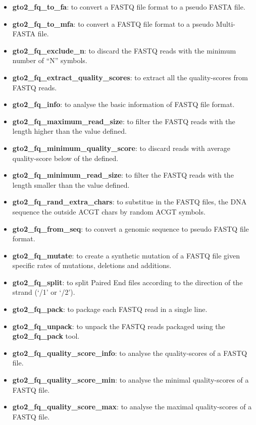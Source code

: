 \documentclass[11pt,]{krantz}
\providecommand{\tightlist}{%
  \setlength{\itemsep}{0pt}\setlength{\parskip}{0pt}}
\begin{document}
\begin{itemize}
\tightlist
\item
  \textbf{gto2\_fq\_to\_fa}: to convert a FASTQ file format to a pseudo
  FASTA file.
\item
  \textbf{gto2\_fq\_to\_mfa}: to convert a FASTQ file format to a pseudo
  Multi-FASTA file.
\item
  \textbf{gto2\_fq\_exclude\_n}: to discard the FASTQ reads with the
  minimum number of ``N'' symbols.
\item
  \textbf{gto2\_fq\_extract\_quality\_scores}: to extract all the
  quality-scores from FASTQ reads.
\item
  \textbf{gto2\_fq\_info}: to analyse the basic information of FASTQ
  file format.
\item
  \textbf{gto2\_fq\_maximum\_read\_size}: to filter the FASTQ reads with
  the length higher than the value defined.
\item
  \textbf{gto2\_fq\_minimum\_quality\_score}: to discard reads with
  average quality-score below of the defined.
\item
  \textbf{gto2\_fq\_minimum\_read\_size}: to filter the FASTQ reads with
  the length smaller than the value defined.
\item
  \textbf{gto2\_fq\_rand\_extra\_chars}: to substitue in the FASTQ
  files, the DNA sequence the outside ACGT chars by random ACGT symbols.
\item
  \textbf{gto2\_fq\_from\_seq}: to convert a genomic sequence to pseudo
  FASTQ file format.
\item
  \textbf{gto2\_fq\_mutate}: to create a synthetic mutation of a FASTQ
  file given specific rates of mutations, deletions and additions.
\item
  \textbf{gto2\_fq\_split}: to split Paired End files according to the
  direction of the strand (`/1' or `/2').
\item
  \textbf{gto2\_fq\_pack}: to package each FASTQ read in a single line.
\item
  \textbf{gto2\_fq\_unpack}: to unpack the FASTQ reads packaged using
  the \textbf{gto2\_fq\_pack} tool.
\item
  \textbf{gto2\_fq\_quality\_score\_info}: to analyse the quality-scores
  of a FASTQ file.
\item
  \textbf{gto2\_fq\_quality\_score\_min}: to analyse the minimal
  quality-scores of a FASTQ file.
\item
  \textbf{gto2\_fq\_quality\_score\_max}: to analyse the maximal
  quality-scores of a FASTQ file.

\end{itemize}
\end{document}
